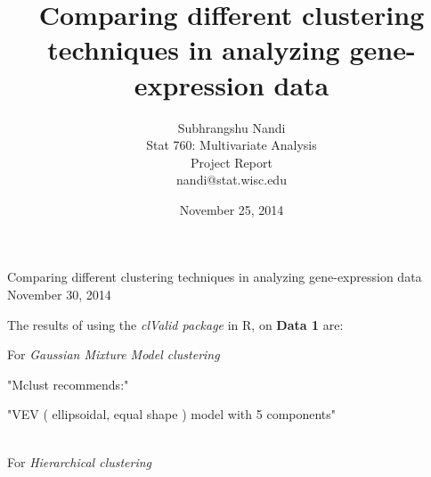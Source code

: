 \documentclass[11p]{article}
\begin{document}



\title{Comparing different clustering techniques in analyzing gene-expression data}
\author{Subhrangshu Nandi\\
  Stat 760: Multivariate Analysis\\
  Project Report \\
  nandi@stat.wisc.edu}
\date{November 25, 2014}


\begin{center}
{\Large{Comparing different clustering techniques in analyzing gene-expression data}}\\
November 30, 2014
\end{center}

\noindent
The results of using the {\emph{clValid package}} in R, on {\bf{Data 1}} are:

\noindent
For {\emph{Gaussian Mixture Model clustering}}\\
\begin{Schunk}
\begin{Soutput}
[1] "Mclust recommends:"
\end{Soutput}
\begin{Soutput}
[1] "VEV ( ellipsoidal, equal shape ) model with 5 components"
\end{Soutput}
\end{Schunk}
\\
\noindent
For {\emph{Hierarchical clustering}}\\
\end{document}
